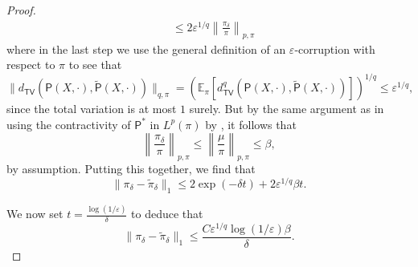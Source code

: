\documentclass[11pt]{article}
\theoremstyle{remark}
\begin{document}
\begin{proof}
\begin{align*}
        &\leq 2\varepsilon^{1/q}\left\|\frac{\pi_{\delta}}{\pi}\right\|_{p,\pi}
    \end{align*}
    where in the last step we use the general definition of an $\varepsilon$-corruption with respect to $\pi$ to see that
    \begin{equation*}
        \|d_{\mathsf{TV}}(\mathsf{P}(X,\cdot),\widetilde{\mathsf{P}}(X,\cdot))\|_{q,\pi}=\left(\mathbb{E}_{\pi}[d^q_{\mathsf{TV}}(\mathsf{P}(X,\cdot),\widetilde{\mathsf{P}}(X,\cdot))]\right)^{1/q}\leq \varepsilon^{1/q},
    \end{equation*}
    since the total variation is at most $1$ surely.
    But by the same argument as in  using the contractivity of $\mathsf{P}^*$ in $L^p(\pi)$ by , it follows that
    \begin{equation*}
        \left\|\frac{\pi_{\delta}}{\pi}\right\|_{p,\pi}\leq \left\|\frac{\mu}{\pi}\right\|_{p,\pi}\leq \beta,
    \end{equation*}
    by assumption. Putting this together, we find that
    \begin{equation*}
        \|\pi_{\delta}-\widetilde{\pi}_{\delta}\|_1\leq 2\exp(-\delta t)+2\varepsilon^{1/q} \beta t .
    \end{equation*}
    
    We now set $t=\frac{\log(1/\varepsilon)}{\delta}$ to deduce that 
    \begin{equation*}
        \|\pi_{\delta}-\widetilde{\pi}_{\delta}\|_1\leq \frac{C\varepsilon^{1/q}\log(1/\varepsilon)\beta}{\delta}.
    \end{equation*}

\end{proof}
\end{document}
